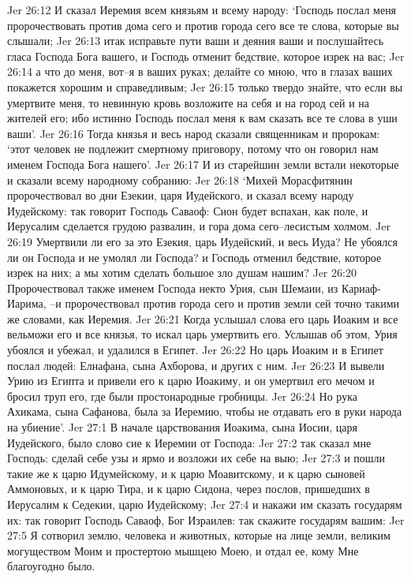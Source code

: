 Jer 26:12  И сказал Иеремия всем князьям и всему народу: `Господь послал меня пророчествовать против дома сего и против города сего все те слова, которые вы слышали;
Jer 26:13  итак исправьте пути ваши и деяния ваши и послушайтесь гласа Господа Бога вашего, и Господь отменит бедствие, которое изрек на вас;
Jer 26:14  а что до меня, вот--я в ваших руках; делайте со мною, что в глазах ваших покажется хорошим и справедливым;
Jer 26:15  только твердо знайте, что если вы умертвите меня, то невинную кровь возложите на себя и на город сей и на жителей его; ибо истинно Господь послал меня к вам сказать все те слова в уши ваши'.
Jer 26:16  Тогда князья и весь народ сказали священникам и пророкам: `этот человек не подлежит смертному приговору, потому что он говорил нам именем Господа Бога нашего'.
Jer 26:17  И из старейшин земли встали некоторые и сказали всему народному собранию:
Jer 26:18  `Михей Морасфитянин пророчествовал во дни Езекии, царя Иудейского, и сказал всему народу Иудейскому: так говорит Господь Саваоф: Сион будет вспахан, как поле, и Иерусалим сделается грудою развалин, и гора дома сего--лесистым холмом.
Jer 26:19  Умертвили ли его за это Езекия, царь Иудейский, и весь Иуда? Не убоялся ли он Господа и не умолял ли Господа? и Господь отменил бедствие, которое изрек на них; а мы хотим сделать большое зло душам нашим?
Jer 26:20  Пророчествовал также именем Господа некто Урия, сын Шемаии, из Кариаф-Иарима, --и пророчествовал против города сего и против земли сей точно такими же словами, как Иеремия.
Jer 26:21  Когда услышал слова его царь Иоаким и все вельможи его и все князья, то искал царь умертвить его. Услышав об этом, Урия убоялся и убежал, и удалился в Египет.
Jer 26:22  Но царь Иоаким и в Египет послал людей: Елнафана, сына Ахборова, и других с ним.
Jer 26:23  И вывели Урию из Египта и привели его к царю Иоакиму, и он умертвил его мечом и бросил труп его, где были простонародные гробницы.
Jer 26:24  Но рука Ахикама, сына Сафанова, была за Иеремию, чтобы не отдавать его в руки народа на убиение'.
Jer 27:1  В начале царствования Иоакима, сына Иосии, царя Иудейского, было слово сие к Иеремии от Господа:
Jer 27:2  так сказал мне Господь: сделай себе узы и ярмо и возложи их себе на выю;
Jer 27:3  и пошли такие же к царю Идумейскому, и к царю Моавитскому, и к царю сыновей Аммоновых, и к царю Тира, и к царю Сидона, через послов, пришедших в Иерусалим к Седекии, царю Иудейскому;
Jer 27:4  и накажи им сказать государям их: так говорит Господь Саваоф, Бог Израилев: так скажите государям вашим:
Jer 27:5  Я сотворил землю, человека и животных, которые на лице земли, великим могуществом Моим и простертою мышцею Моею, и отдал ее, кому Мне благоугодно было.
